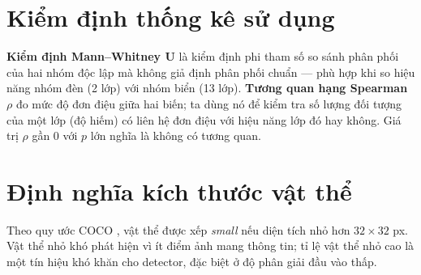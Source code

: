 \section{Kiểm định thống kê sử dụng}

\textbf{Kiểm định Mann--Whitney U} \cite{mannwhitney} là kiểm định phi tham số so sánh phân phối
của hai nhóm độc lập mà không giả định phân phối chuẩn --- phù hợp khi so hiệu năng nhóm đèn (2
lớp) với nhóm biển (13 lớp). \textbf{Tương quan hạng Spearman} $\rho$ \cite{spearman} đo mức độ
đơn điệu giữa hai biến; ta dùng nó
để kiểm tra số lượng đối tượng của một lớp (độ hiếm) có liên hệ đơn điệu với hiệu năng lớp đó
hay không. Giá trị $\rho$ gần 0 với $p$ lớn nghĩa là không có tương quan.

\section{Định nghĩa kích thước vật thể}

Theo quy ước COCO \cite{coco}, vật thể được xếp \emph{small} nếu diện tích nhỏ hơn $32\times32$
px. Vật thể nhỏ khó phát hiện vì ít điểm ảnh mang thông tin; tỉ lệ vật thể nhỏ cao là một tín
hiệu khó khăn cho detector, đặc biệt ở độ phân giải đầu vào thấp.
